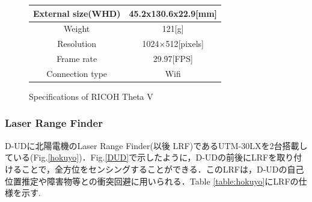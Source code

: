 \documentclass[12pt]{sonota/aislab}
\begin{document}
\begin{figure}
\begin{minipage}{0.5\textwidth}
\begin{center}
\makeatletter
\def\@captype{table}
\makeatother
\caption{Specifications of RICOH Theta V}
	\begin{tabular}[tbp]{|c|c|}
		\hline 
		External size(WHD) & 45.2x130.6x22.9[mm] \\\hline
		Weight & 121[g] \\\hline
		Resolution & 1024×512[pixels] \\\hline
		Frame rate & 29.97[FPS] \\\hline
		Connection type & Wifi \\\hline
	\end{tabular}
\label{table:ThetaV_TABLE}
\end{center}
\end{minipage}
\end{figure}

\subsubsection{Laser Range Finder}
D-UDに北陽電機のLaser Range Finder(以後 LRF)であるUTM-30LXを2台搭載している(Fig.\ref{hokuyo})．Fig.\ref{DUD}で示したように，D-UDの前後にLRFを取り付けることで，全方位をセンシングすることができる．このLRFは，D-UDの自己位置推定や障害物等との衝突回避に用いられる．Table \ref{table:hokuyo}にLRFの仕様を示す.
\end{document}
